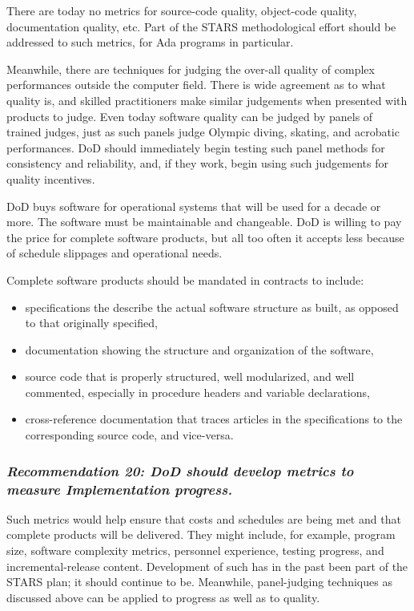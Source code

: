 \documentclass[12pt]{article}
\begin{document}
There are today no metrics for source-code quality, object-code quality,
documentation quality, etc. Part of the STARS methodological effort should be
addressed to such metrics, for Ada programs in particular.

Meanwhile, there are techniques for judging the over-all quality of complex
performances outside the computer field. There is wide agreement as to what
quality is, and skilled practitioners make similar judgements when presented
with products to judge. Even today software quality can be judged by panels of
trained judges, just as such panels judge Olympic diving, skating, and
acrobatic performances. DoD should immediately begin testing such panel methods
for consistency and reliability, and, if they work, begin using such judgements
for quality incentives.

DoD buys software for operational systems that will be used for a decade or
more. The software must be maintainable and changeable. DoD is willing to pay
the price for complete software products, but all too often it accepts less
because of schedule slippages and operational needs.

Complete software products should be mandated in contracts to include:

\begin{itemize}
    \item specifications the describe the actual software structure as built,
        as opposed to that originally specified,
    \item documentation showing the structure and organization of the software,
    \item source code that is properly structured, well modularized, and well
        commented, especially in procedure headers and variable declarations,
    \item cross-reference documentation that traces articles in the
        specifications to the corresponding source code, and vice-versa.
\end{itemize}

\subsubsection*{\textit{Recommendation 20: DoD should develop metrics to
measure Implementation progress.}}

Such metrics would help ensure that costs and schedules are being met and that
complete products will be delivered. They might include, for example, program
size, software complexity metrics, personnel experience, testing progress, and
incremental-release content. Development of such has in the past been part of
the STARS plan; it should continue to be. Meanwhile, panel-judging techniques
as discussed above can be applied to progress as well as to quality.
\end{document}
